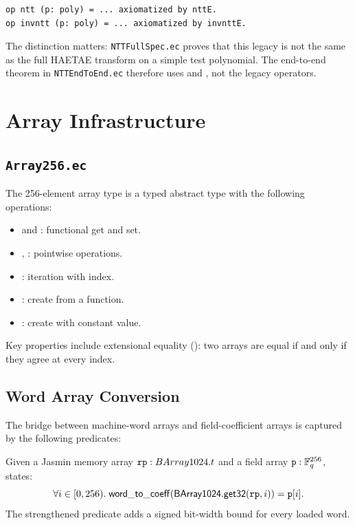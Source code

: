 \begin{lstlisting}[language=EasyCrypt,
  caption={Legacy NTT equations in \texttt{Rq.ec}},
  label={lst:rq_ntt_axiom}]
op ntt (p: poly) = ... axiomatized by nttE.
op invntt (p: poly) = ... axiomatized by invnttE.
\end{lstlisting}

The distinction matters: \texttt{NTTFullSpec.ec} proves that this legacy
 is not the same as the full HAETAE transform on a simple test
polynomial.  The end-to-end theorem in \texttt{NTTEndToEnd.ec} therefore uses
 and , not the legacy
 operators.

\section{Array Infrastructure}

\subsection{\texttt{Array256.ec}}

The 256-element array type  is a typed abstract type with
the following operations:
\begin{itemize}
  \item {} and : functional get and set.
  \item {}, : pointwise operations.
  \item {}: iteration with index.
  \item {}: create from a function.
  \item {}: create with constant value.
\end{itemize}

Key properties include extensional equality ():
two arrays are equal if and only if they agree at every index.

\subsection{Word Array Conversion}

The bridge between machine-word arrays and field-coefficient arrays is
captured by the following predicates:

\begin{definition}
  Given a Jasmin memory array $\mathtt{rp} : BArray1024.t$ and a field
  array $\mathtt{p} : \mathbb{F}_q^{256}$,  states:
  \[
    \forall i \in [0, 256).\;
    \mathsf{word\_to\_coeff}(\mathsf{BArray1024.get32}(\mathtt{rp},i)) =
      \mathtt{p}[i].
  \]
  The strengthened predicate  adds a signed
  bit-width bound  for every loaded word.
\label{def:poly-repr}
\end{definition}

